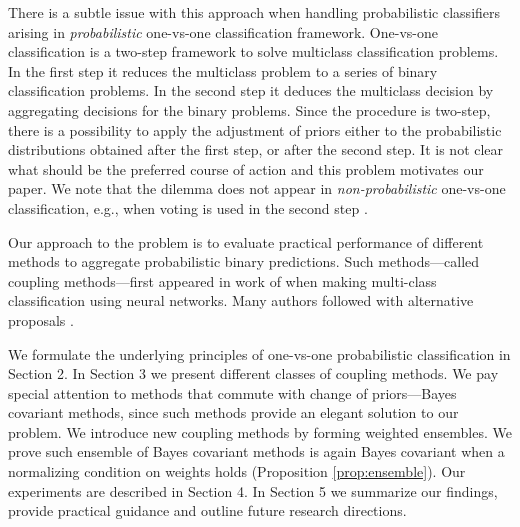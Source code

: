 There is a subtle issue with this approach  when handling probabilistic 
classifiers arising in \emph{probabilistic} one-vs-one classification framework.   
One-vs-one classification is a two-step framework to solve 
multiclass classification problems.
In the first step it reduces the multiclass problem to a series of binary
classification problems. 
In the second step it deduces the multiclass decision by aggregating decisions 
for the binary problems. Since the procedure is two-step, there is a possibility 
to apply the adjustment of priors either to the probabilistic distributions 
obtained after the first step, or after the second step. It is not clear what 
should be the preferred course of action and this problem motivates our paper. We note that the dilemma does not appear
in \emph{non-probabilistic} one-vs-one classification, e.g., when voting is used in the second step \cite{galar2011overview}.


Our approach to the problem is to evaluate practical performance of different 
methods to aggregate probabilistic binary predictions. Such methods---called coupling methods---first appeared in work of \cite{refregier1991probabilistic} when making 
multi-class classification using neural networks. 
Many authors followed with alternative proposals 
\cite{price1994pairwise, hastie1998classification,  zahorian1999partitioned,
wu2004probability, vsuch2015new, vsuch2016bayes}.

We formulate the underlying principles of one-vs-one probabilistic classification in Section 2. In Section 3 we present  different classes of coupling methods. 
We pay special attention to methods that commute with change of priors---Bayes covariant methods, 
since such methods provide an  elegant solution to our problem. 
We introduce new coupling methods by forming weighted ensembles. We prove such ensemble of Bayes covariant methods is again Bayes covariant
when a normalizing condition on weights holds (Proposition \ref{prop:ensemble}).  
Our experiments are described in Section 4. In Section 5 we summarize our findings, 
provide practical guidance and outline future research directions.